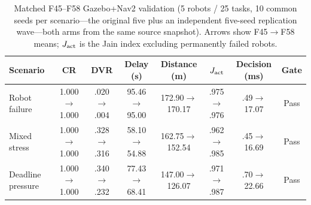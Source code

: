 \begin{table}[t]
\centering
\caption{Matched F45--F58 Gazebo+Nav2 validation
(5 robots / 25 tasks, 10 common seeds per scenario---the original five
plus an independent five-seed replication wave---both arms from the same
source snapshot). Arrows show F45$\rightarrow$F58 means; $J_{\rm act}$ is
the Jain index excluding permanently failed robots.}
\label{tab:f58-gazebo}
\small
\setlength{\tabcolsep}{3.8pt}
\begin{tabular}{lccccccc}
\toprule
Scenario & CR & DVR & Delay (s) & Distance (m) & $J_{\rm act}$ & Decision (ms) & Gate \\
\midrule
Robot failure
  & 1.000$\to$1.000 & .020$\to$.004 & 95.46$\to$95.00
  & 172.90$\to$170.17 & .975$\to$.976 & .49$\to$17.07 & Pass \\
Mixed stress
  & 1.000$\to$1.000 & .328$\to$.316 & 58.10$\to$54.88
  & 162.75$\to$152.54 & .962$\to$.985 & .45$\to$16.69 & Pass \\
Deadline pressure
  & 1.000$\to$1.000 & .340$\to$.232 & 77.43$\to$68.41
  & 147.00$\to$126.07 & .971$\to$.987 & .70$\to$22.66 & Pass \\
\bottomrule
\end{tabular}
\end{table}
